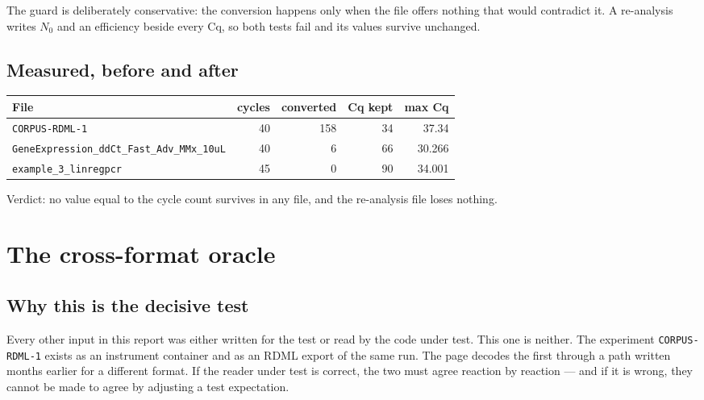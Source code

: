 The guard is deliberately conservative: the conversion happens only when the file offers nothing
that would contradict it. A re-analysis writes $N_0$ and an efficiency beside every Cq, so both
tests fail and its values survive unchanged.

\subsection*{Measured, before and after}
\begin{longtable}{@{}p{54mm}r r r r@{}}
\toprule
\textbf{File} & \textbf{cycles} & \textbf{converted} & \textbf{Cq kept} & \textbf{max Cq} \\
\midrule\endhead

\texttt{CORPUS-RDML-1} & 40 & 158 & 34 & 37.34 \\

\texttt{GeneExpression\_\allowbreak{}ddCt\_\allowbreak{}Fast\_\allowbreak{}Adv\_\allowbreak{}MMx\_\allowbreak{}10uL} & 40 & 6 & 66 & 30.266 \\

\texttt{example\_3\_linregpcr} & 45 & 0 & 90 & 34.001 \\

\bottomrule\end{longtable}
Verdict: no value equal to the cycle count survives in any file, and the re-analysis file loses
nothing. \PASS

\section{The cross-format oracle}\label{sec:oracle}

\subsection*{Why this is the decisive test}
Every other input in this report was either written for the test or read by the code under test.
This one is neither. The experiment \texttt{CORPUS-RDML-1} exists as an instrument container
and as an RDML export of the same run. The page decodes the first through a path written months
earlier for a different format. If the reader under test is correct, the two must agree reaction by
reaction --- and if it is wrong, they cannot be made to agree by adjusting a test expectation.


